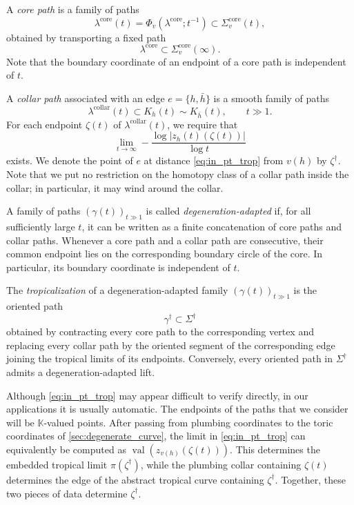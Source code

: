 \documentclass[12pt]{amsart}
\numberwithin{equation}{section}
\theoremstyle{definition}
\newcommand{\val}{\operatorname{val}}
\def\Puis{\mathbb K}
\def\val{\operatorname{val}}
\def\trop{\dagger}
\def\ptSig{\zeta}
\def\mcurve{\Sigma}
\def\tropmcurve{\mcurve^\trop}
\begin{document}
A \emph{core path} is a family of paths
\[
\lambda^{\mathrm{core}}(t)
=
\Phi_{v}(\lambda^{\mathrm{core}};t^{-1})
\subset
\mcurve_v^{\mathrm{core}}(t),
\]
obtained by transporting a fixed path
\[
\lambda^{\mathrm{core}}
\subset
\mcurve_v^{\mathrm{core}}(\infty).
\]
Note that the boundary coordinate of an endpoint of a core path is independent of $t$.


A \emph{collar path} associated with an edge
$e=\{h,\bar h\}$ is a smooth family of paths
\[
\lambda^{\mathrm{collar}}(t)
\subset
K_h(t)\sim K_{\bar h}(t),
\qquad t\gg1.
\]
For each endpoint $\ptSig(t)$ of $\lambda^{\mathrm{collar}}(t)$, we require
that
\begin{equation}\label{eq:in_pt_trop}
\lim_{t\to\infty}
-\frac{\log |z_h(t)(\ptSig(t))|}{\log t}
\end{equation}
exists. We denote the point of $e$ at distance \eqref{eq:in_pt_trop} from $v(h)$ by $\ptSig^\trop$. Note that we put no restriction on the homotopy class of a collar path inside
the collar; in particular, it may wind around the collar.

A family of paths $(\gamma(t))_{t\gg1}$ is called
\emph{degeneration-adapted} if, for all sufficiently large $t$, it can
be written as a finite concatenation of core paths and collar paths.
Whenever a core path and a collar path are consecutive, their common
endpoint lies on the corresponding boundary circle of the core.
In particular, its boundary coordinate is independent of $t$.

The \emph{tropicalization} of a degeneration-adapted family
$(\gamma(t))_{t\gg1}$ is the oriented path
\[
\gamma^\trop\subset\tropmcurve
\]
obtained by contracting every core path to the corresponding vertex and
replacing every collar path by the oriented segment of the corresponding
edge joining the tropical limits of its endpoints. Conversely, every oriented path in $\tropmcurve$ admits a
degeneration-adapted lift.

Although \eqref{eq:in_pt_trop} may appear difficult to verify directly,
in our applications it is usually automatic. The endpoints of the paths
that we consider will be $\Puis$-valued points. After passing from
plumbing coordinates to the toric coordinates of
\cref{sec:degenerate_curve}, the limit in \eqref{eq:in_pt_trop} can
equivalently be computed as $\val(z_{v(h)}(\ptSig(t)))$. This determines the embedded tropical limit
$\pi(\ptSig^\trop)$, while the plumbing collar containing $\ptSig(t)$
determines the edge of the abstract tropical curve containing
$\ptSig^\trop$. Together, these two pieces of data determine
$\ptSig^\trop$.
\end{document}
